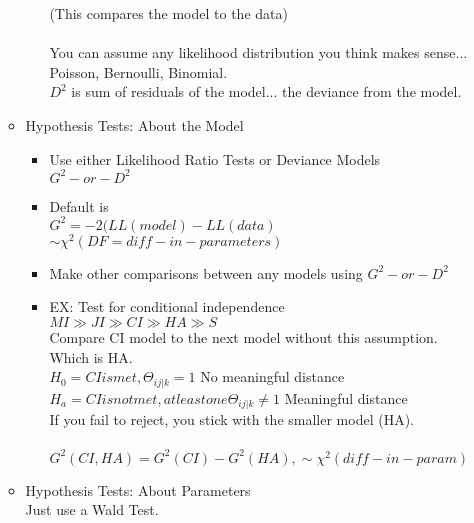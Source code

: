 \documentclass[12 pt]{article}
\begin{document}
\begin{enumerate}
\begin{itemize}
\begin{itemize}
                    (This compares the model to the data)\\\\
                    You can assume any likelihood distribution you think makes sense... Poisson, Bernoulli, Binomial. \\
                    \(D^2\) is sum of residuals of the model... the deviance from the model. 
                \end{itemize}
            \item Hypothesis Tests: About the Model
                \begin{itemize}
                    \item Use either Likelihood Ratio Tests or Deviance Models \\
                    \( G^2 - or - D^2 \) \\
                    \item Default is\\
                    $ G^2 = -2(LL(model) - LL(data)$\\
                    $ \sim\chi^2(DF=diff-in-parameters)$
                    \item Make other comparisons between any models using \( G^2 - or - D^2 \) \\
                    \item EX: Test for conditional independence \\
                    $MI \gg JI \gg CI \gg HA \gg S$\\
                    Compare CI model to the next model without this assumption. \\
                    Which is HA. \\
                    $H_0 = CI is met, \Theta_{ij|k} = 1$ No meaningful distance\\
                    $H_a = CI is not met, at least one \Theta_{ij|k} \neq 1$ Meaningful distance\\
                    If you fail to reject, you stick with the smaller model (HA). \\\\
                    $G^2(CI, HA) = G^2(CI) - G^2(HA), \sim\chi^2(diff-in-param)$
                \end{itemize}
                
            \item Hypothesis Tests: About Parameters\\
                Just use a Wald Test. 
        \end{itemize}
\end{enumerate}
\end{document}

